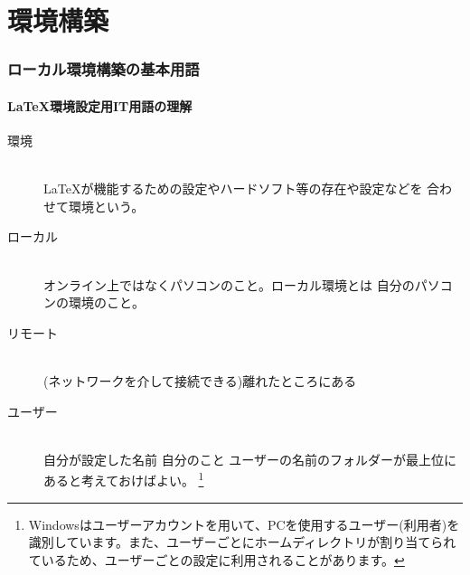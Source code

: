 \documentclass[titlepage]{ltjsarticle}
\begin{document}
\part{環境構築}
\section{ローカル環境構築の基本用語}
\subsection{\LaTeX 環境設定用IT用語の理解}

\begin{description}
  \item [環境] ~\\
        \LaTeX が機能するための設定やハードソフト等の存在や設定などを
        合わせて環境という。
  \item [ローカル] ~\\
        オンライン上ではなくパソコンのこと。ローカル環境とは
        自分のパソコンの環境のこと。


  \item[リモート] ~\\
    (ネットワークを介して接続できる)離れたところにある
  \item [ユーザー] ~\\
        自分が設定した名前 自分のこと
        ユーザーの名前のフォルダーが最上位にあると考えておけばよい。
        \footnote{Windowsはユーザーアカウントを用いて、PCを使用するユーザー(利用者)を識別しています。また、ユーザーごとにホームディレクトリが割り当てられているため、ユーザーごとの設定に利用されることがあります。}



\end{description}
\end{document}
